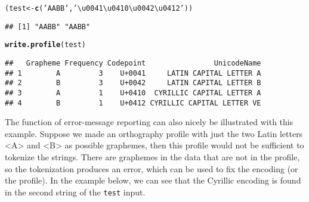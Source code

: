 \documentclass[output=inprep,
		biblatex
		]{LSP/langsci}\usepackage[]{graphicx}\usepackage[]{color}
\makeatletter
\newcommand{\hlstr}[1]{\textcolor[rgb]{0.192,0.494,0.8}{#1}}%
\newcommand{\hlstd}[1]{\textcolor[rgb]{0.345,0.345,0.345}{#1}}%
\newcommand{\hlkwb}[1]{\textcolor[rgb]{0.69,0.353,0.396}{#1}}%
\newcommand{\hlkwd}[1]{\textcolor[rgb]{0.737,0.353,0.396}{\textbf{#1}}}%
\newenvironment{kframe}{%
 \def\at@end@of@kframe{}%
 \ifinner\ifhmode%
  \def\at@end@of@kframe{\end{minipage}}%
  \begin{minipage}{\columnwidth}%
 \fi\fi%
 \def\FrameCommand##1{\hskip\@totalleftmargin \hskip-\fboxsep
 \colorbox{shadecolor}{##1}\hskip-\fboxsep
     \hskip-\linewidth \hskip-\@totalleftmargin \hskip\columnwidth}%
 \MakeFramed {\advance\hsize-\width
   \@totalleftmargin\z@ \linewidth\hsize
   \@setminipage}}%
 {\par\unskip\endMakeFramed%
 \at@end@of@kframe}
\newenvironment{knitrout}{}{} %
\makeatother
\begin{document}
\begin{knitrout}\footnotesize
{}\color{fgcolor}\begin{kframe}
\begin{alltt}
\hlstd{( test} \hlkwb{<-} \hlkwd{c}\hlstd{(}\hlstr{'AABB'}\hlstd{,} \hlstr{'\textbackslash{}u0041\textbackslash{}u0410\textbackslash{}u0042\textbackslash{}u0412'}\hlstd{) )}
\end{alltt}
\begin{verbatim}
## [1] "AABB" "AАBВ"
\end{verbatim}
\begin{alltt}
\hlkwd{write.profile}\hlstd{(test)}
\end{alltt}
\begin{verbatim}
##   Grapheme Frequency Codepoint                UnicodeName
## 1        A         3    U+0041     LATIN CAPITAL LETTER A
## 2        B         3    U+0042     LATIN CAPITAL LETTER B
## 3        А         1    U+0410  CYRILLIC CAPITAL LETTER A
## 4        В         1    U+0412 CYRILLIC CAPITAL LETTER VE
\end{verbatim}
\end{kframe}
\end{knitrout}

The function of error-message reporting can also nicely be illustrated
with this example. Suppose we made an orthography profile with just the two
Latin letters <A> and <B> as possible graphemes, then this profile would not be
sufficient to tokenize the strings. There are graphemes in the data that are not
in the profile, so the tokenization produces an error, which can be used to fix
the encoding (or the profile). In the example below, we can see that the
Cyrillic encoding is found in the second string of the \texttt{test} input.
\end{document}
